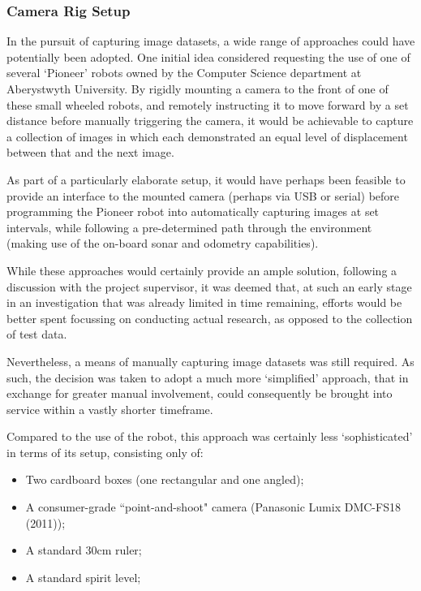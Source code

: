 \subsubsection{Camera Rig Setup}

In the pursuit of capturing image datasets, a wide range of approaches could have potentially been adopted. One initial idea considered requesting the use of one of several `Pioneer' robots owned by the Computer Science department at Aberystwyth University. By rigidly mounting a camera to the front of one of these small wheeled robots, and remotely instructing it to move forward by a set distance before manually triggering the camera, it would be achievable to capture a collection of images in which each demonstrated an equal level of displacement between that and the next image. 

As part of a particularly elaborate setup, it would have perhaps been feasible to provide an interface to the mounted camera (perhaps via USB or serial) before programming the Pioneer robot into automatically capturing images at set intervals, while following a pre-determined path through the environment (making use of the on-board sonar and odometry capabilities). 

While these approaches would certainly provide an ample solution, following a discussion with the project supervisor, it was deemed that, at such an early stage in an investigation that was already limited in time remaining, efforts would be better spent focussing on conducting actual research, as opposed to the collection of test data.

Nevertheless, a means of manually capturing image datasets was still required. As such, the decision was taken to adopt a much more `simplified' approach, that in exchange for greater manual involvement, could consequently be brought into service within a vastly shorter timeframe. 

Compared to the use of the robot, this approach was certainly less `sophisticated' in terms of its setup, consisting only of:

\begin{itemize}
	\item Two cardboard boxes (one rectangular and one angled);
	\item A consumer-grade ``point-and-shoot" camera (Panasonic Lumix DMC-FS18 (2011));
	\item A standard 30cm ruler;
	\item A standard spirit level;
\end{itemize}

